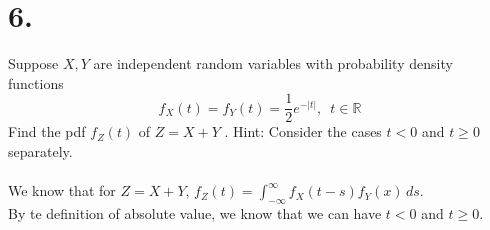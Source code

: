 \documentclass{article}
\begin{document}
\section*{6.}
{\Large 
Suppose $X, Y$  are independent random variables with probability density functions
\[f_X (t) = f_Y (t) =\frac12e^{-|t|}, \,\,\, t \in \mathbb R\]
Find the pdf $f_Z (t)$ of $Z = X + Y$ . Hint: Consider the cases $t < 0$ and $t \ge 0$ separately. \\ \\ 
We know that for $Z = X + Y$, $f_Z(t) = \int_{-\infty}^{\infty}f_X(t - s)f_Y(x) \,ds$. \\ 
By te definition of absolute value, we know that we can have $t < 0$ and $t \geq 0$. 

}
\end{document}
